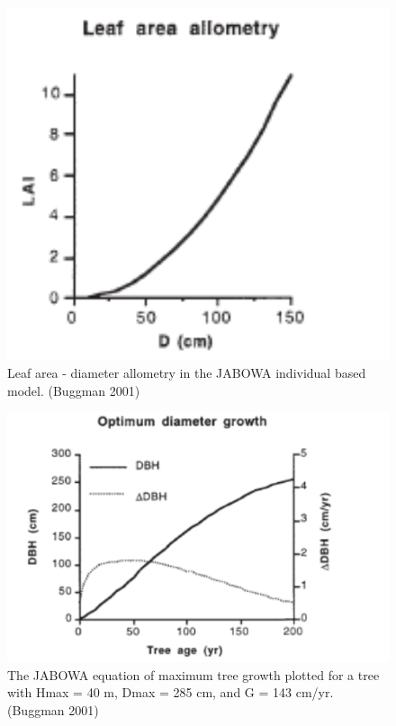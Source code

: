 \documentclass[12pt,oneside]{book}
\begin{document}
\begin{figure}

{\centering \includegraphics[width=0.8\linewidth]{figures/chap6/f622_LD_allom} 

}

\caption{Leaf area - diameter allometry in the JABOWA individual based model. (Buggman 2001)}\label{fig:f622}
\end{figure}

\begin{figure}

{\centering \includegraphics[width=0.8\linewidth]{figures/chap6/f623_jabowa_growth} 

}

\caption{The JABOWA equation of maximum tree growth plotted for a tree with Hmax = 40 m, Dmax = 285 cm, and G = 143 cm/yr. (Buggman 2001)}\label{fig:f623}
\end{figure}
\end{document}

